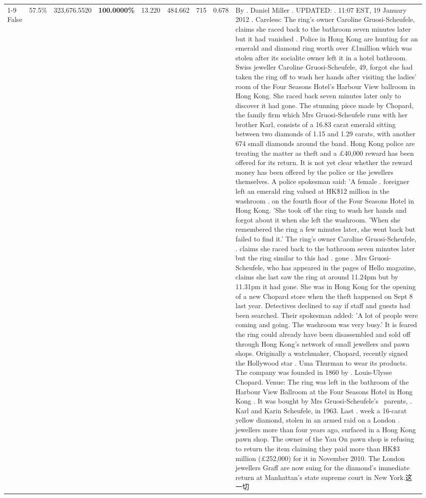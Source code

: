 \begin{table}[H]
\begin{tabular}{lllrlllll}
\cline{1-9}
False & 57.5\% & 323,676.5520 & \bfseries \color{red} 100.0000\% & 13.220 & 484.662 & 715 & 0.678 & By . Daniel Miller . UPDATED: . 11:07 EST, 19 January 2012 . Careless: The ring's owner Caroline Gruosi-Scheufele, claims she raced back to the bathroom seven minutes later but it had vanished . Police in Hong Kong are hunting for an emerald and diamond ring worth over £1million which was stolen after its socialite owner left it in a hotel bathroom. Swiss jeweller Caroline Gruosi-Scheufele, 49, forgot she had taken the ring off to wash her hands after visiting the ladies' room of the Four Seasons Hotel's Harbour View ballroom in Hong Kong. She raced back seven minutes later only to discover it had gone. The stunning piece made by Chopard, the family firm which Mrs Gruosi-Scheufele runs with her brother Karl, consists of a 16.83 carat emerald sitting between two diamonds of 1.15 and 1.29 carats, with another 674 small diamonds around the band. Hong Kong police are treating the matter as theft and a £40,000 reward has been offered for its return. It is not yet clear whether the reward money has been offered by the police or the jewellers themselves. A police spokesman said: 'A female . foreigner left an emerald ring valued at HK\$12 million in the washroom . on the fourth floor of the Four Seasons Hotel in Hong Kong. 'She took off the ring to wash her hands and forgot about it when she left the washroom. 'When she remembered the ring a few minutes later, she went back but failed to find it.' The ring's owner Caroline Gruosi-Scheufele, . claims she raced back to the bathroom seven minutes later but the ring similar to this had . gone . Mrs Gruosi-Scheufele, who has appeared in the pages of Hello magazine, claims she last saw the ring at around 11.24pm but by 11.31pm it had gone. She was in Hong Kong for the opening of a new Chopard store when the theft happened on Sept 8 last year. Detectives declined to say if staff and guests had been searched. Their spokesman added: 'A lot of people were coming and going. The washroom was very busy.' It is feared the ring could already have been disassembled and sold off through Hong Kong's network of small jewellers and pawn shops. Originally a watchmaker, Chopard, recently signed the Hollywood star . Uma Thurman to wear its products. The company was founded in 1860 by . Louis-Ulysse Chopard. Venue: The ring was left in the bathroom of the Harbour View Ballroom at the Four Seasons Hotel in Hong Kong . It was bought by Mrs Gruosi-Scheufele's  parents, . Karl and Karin Scheufele, in 1963. Last . week a 16-carat yellow diamond, stolen in an armed raid on a London . jewellers more than four years ago, surfaced in a Hong Kong pawn shop. The owner of the Yau On pawn shop is refusing to return the item claiming they paid more than HK\$3 million (£252,000) for it in November 2010. The London jewellers Graff are now suing for the diamond’s immediate return at Manhattan’s state supreme court in New York.这一切 \\

\end{tabular}
\end{table}

